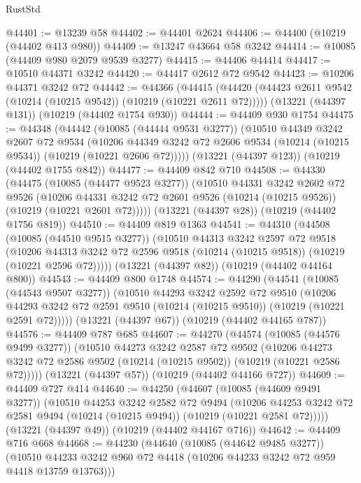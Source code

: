 \begin{lexlean}{RustStd}
\begin{coremodule}
@44401 := @13239 @58
@44402 := @44401 @2624
@44406 := @44400 (@10219 (@44402 @413 @980))
@44409 := @13247 @43664 @58 @3242
@44414 := @10085 (@44409 @980 @2079 @9539 @3277)
@44415 := @44406 @44414
@44417 := @10510 @44371 @3242
@44420 := @44417 @2612 @72 @9542
@44423 := @10206 @44371 @3242 @72
@44442 := @44366
    (@44415 (@44420 (@44423 @2611 @9542 (@10214 (@10215 @9542)) (@10219 (@10221 @2611 @72)))))
    (@13221 (@44397 @131))
    (@10219 (@44402 @1754 @930))
@44444 := @44409 @930 @1754
@44475 := @44348
    (@44442
      (@10085 (@44444 @9531 @3277))
      (@10510
        @44349
        @3242
        @2607
        @72
        @9534
        (@10206 @44349 @3242 @72 @2606 @9534 (@10214 (@10215 @9534)) (@10219 (@10221 @2606 @72)))))
    (@13221 (@44397 @123))
    (@10219 (@44402 @1755 @842))
@44477 := @44409 @842 @710
@44508 := @44330
    (@44475
      (@10085 (@44477 @9523 @3277))
      (@10510
        @44331
        @3242
        @2602
        @72
        @9526
        (@10206 @44331 @3242 @72 @2601 @9526 (@10214 (@10215 @9526)) (@10219 (@10221 @2601 @72)))))
    (@13221 (@44397 @28))
    (@10219 (@44402 @1756 @819))
@44510 := @44409 @819 @1363
@44541 := @44310
    (@44508
      (@10085 (@44510 @9515 @3277))
      (@10510
        @44313
        @3242
        @2597
        @72
        @9518
        (@10206 @44313 @3242 @72 @2596 @9518 (@10214 (@10215 @9518)) (@10219 (@10221 @2596 @72)))))
    (@13221 (@44397 @82))
    (@10219 (@44402 @44164 @800))
@44543 := @44409 @800 @1748
@44574 := @44290
    (@44541
      (@10085 (@44543 @9507 @3277))
      (@10510
        @44293
        @3242
        @2592
        @72
        @9510
        (@10206 @44293 @3242 @72 @2591 @9510 (@10214 (@10215 @9510)) (@10219 (@10221 @2591 @72)))))
    (@13221 (@44397 @67))
    (@10219 (@44402 @44165 @787))
@44576 := @44409 @787 @685
@44607 := @44270
    (@44574
      (@10085 (@44576 @9499 @3277))
      (@10510
        @44273
        @3242
        @2587
        @72
        @9502
        (@10206 @44273 @3242 @72 @2586 @9502 (@10214 (@10215 @9502)) (@10219 (@10221 @2586 @72)))))
    (@13221 (@44397 @57))
    (@10219 (@44402 @44166 @727))
@44609 := @44409 @727 @414
@44640 := @44250
    (@44607
      (@10085 (@44609 @9491 @3277))
      (@10510
        @44253
        @3242
        @2582
        @72
        @9494
        (@10206 @44253 @3242 @72 @2581 @9494 (@10214 (@10215 @9494)) (@10219 (@10221 @2581 @72)))))
    (@13221 (@44397 @49))
    (@10219 (@44402 @44167 @716))
@44642 := @44409 @716 @668
@44668 := @44230
    (@44640
      (@10085 (@44642 @9485 @3277))
      (@10510 @44233 @3242 @960 @72 @4418 (@10206 @44233 @3242 @72 @959 @4418 @13759 @13763)))

\end{coremodule}
\end{lexlean}
